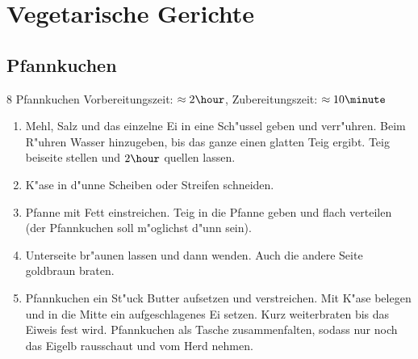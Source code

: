 \chapter{Vegetarische Gerichte}
\section{Pfannkuchen}
8 Pfannkuchen \hfill Vorbereitungszeit: $\approx 2 \hour$, Zubereitungszeit: $\approx10 \minute$
\hspace{0em}\\
\begin{enumerate}
\item   Mehl, Salz und das einzelne Ei in eine Sch"ussel geben und verr"uhren.
        Beim R"uhren Wasser hinzugeben, bis das ganze einen glatten Teig ergibt.
        Teig beiseite stellen und $2 \hour$ quellen lassen.
\item   K"ase in d"unne Scheiben oder Streifen schneiden.
\item   Pfanne mit Fett einstreichen.
        Teig in die Pfanne geben und flach verteilen (der Pfannkuchen soll m"oglichst d"unn sein).
\item   Unterseite br"aunen lassen und dann wenden.
        Auch die andere Seite goldbraun braten.
\item   Pfannkuchen ein St"uck Butter aufsetzen und verstreichen.
        Mit K"ase belegen und in die Mitte ein aufgeschlagenes Ei setzen.
        Kurz weiterbraten bis das Eiweis fest wird.
        Pfannkuchen als Tasche zusammenfalten, sodass nur noch das Eigelb rausschaut
        und vom Herd nehmen.
\end{enumerate}

